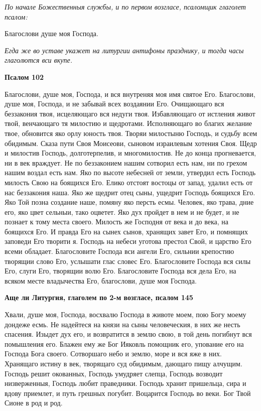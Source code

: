 \itshape По начале Божественныя службы, и по первом возгласе, псаломщик глаголет псалом:\normalfont{}


Благослови душе моя Господа.


\itshape Егда же во уставе укажет на литургии антифоны празднику, и тогда часы глаголются вси вкупе.\normalfont{}





\bfseries Псалом 102\normalfont{}


Благослови, душе моя, Господа, и вся внутреняя моя имя святое Его. Благослови, душе моя, Господа, и не забывай всех воздаянии Его. Очищающаго вся беззакония твоя, исцеляющаго вся недуги твоя. Избавляющаго от истления живот твой, венчающаго тя милостию и щедротами. Исполняющаго во благих желание твое, обновится яко орлу юность твоя. Творяи милостыню Господь, и судьбу всем обидимым. Сказа пути Своя Моисеови, сыновом израилевым хотения Своя. Щедр и милостив Господь, долготерпелив, и многомилостив. Не до конца прогневается, ни в век враждует. Не по беззаконием нашим сотворил есть нам, ни по грехом нашим воздал есть нам. Яко по высоте небесней от земли, утвердил есть Господь милость Свою на боящихся Его. Елико отстоят востоцы от запад, удалил есть от нас беззакония наша. Яко же щедрит отец сыны, ущедрит Господь боящихся Его. Яко Той позна создание наше, помяну яко персть есмы. Человек, яко трава, дние его, яко цвет сельныи, тако оцветет. Яко дух пройдет в нем и не будет, и не познает к тому места своего. Милость же Господня от века и до века, на боящихся Его. И правда Его на сынех сынов, хранящих завет Его, и помнящих заповеди Его творити я. Господь на небеси уготова престол Свой, и царство Его всеми обладает. Благословите Господа вси ангели Его, сильнии крепостию творящии слово Его, услышати глас словес Его. Благословите Господа вся силы Его, слуги Его, творящии волю Его. Благословите Господа вся дела Его, на всяком месте владычества Его, благослови, душе моя Господа.





\bfseries Аще ли Литургия, глаголем по 2-м возгласе, псалом 145\normalfont{}


Хвали, душе моя, Господа, восхвалю Господа в животе моем, пою Богу моему дондеже есмь. Не надейтеся на князи на сыны человеческия, в них же несть спасения. Изыдет дух его, и возвратится в землю свою, в той день погибнут вся помышления его. Блажен ему же Бог Ияковль помощник его, упование его на Господа Бога своего. Сотворшаго небо и землю, море и вся яже в них. Хранящаго истину в век, творящаго суд обидимым, дающаго пищу алчущим. Господь решит окованных, Господь умудряет слепца, Господь возводит низверженныя, Господь любит праведники. Господь хранит пришельца, сира и вдову приемлет, и путь грешных погубит. Воцарится Господь во веки. Бог Твой Сионе в род и род.


